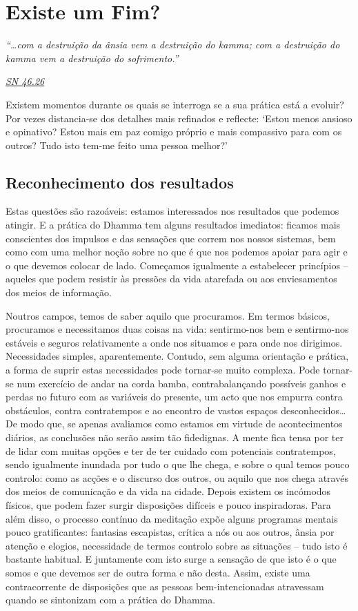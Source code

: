 \chapter{Existe um Fim?}

\emph{``\ldots{}com a destruição da ânsia vem a destruição do kamma; com a destruição do kamma vem a destruição do sofrimento.''}

\href{https://suttacentral.net/sn46.26/en/bodhi}{\emph{SN 46.26}}

Existem momentos durante os quais se interroga se a sua prática está a evoluir? Por vezes distancia-se dos detalhes mais refinados e reflecte: `Estou menos ansioso e opinativo? Estou mais em paz comigo próprio e mais compassivo para com os outros? Tudo isto tem-me feito uma pessoa melhor?'

\section{Reconhecimento dos resultados}

Estas questões são razoáveis: estamos interessados nos resultados que podemos atingir. E a prática do Dhamma tem alguns resultados imediatos: ficamos mais conscientes dos impulsos e das sensações que correm nos nossos sistemas, bem como com uma melhor noção sobre no que é que nos podemos apoiar para agir e o que devemos colocar de lado. Começamos igualmente a estabelecer princípios -- aqueles que podem resistir às pressões da vida atarefada ou aos enviesamentos dos meios de informação.

Noutros campos, temos de saber aquilo que procuramos. Em termos básicos, procuramos e necessitamos duas coisas na vida: sentirmo-nos bem e sentirmo-nos estáveis e seguros relativamente a onde nos situamos e para onde nos dirigimos. Necessidades simples, aparentemente. Contudo, sem alguma orientação e prática, a forma de suprir estas necessidades pode tornar-se muito complexa. Pode tornar-se num exercício de andar na corda bamba, contrabalançando possíveis ganhos e perdas no futuro com as variáveis do presente, um acto que nos empurra contra obstáculos, contra contratempos e ao encontro de vastos espaços desconhecidos\ldots{} De modo que, se apenas avaliamos como estamos em virtude de acontecimentos diários, as conclusões não serão assim tão fidedignas. A mente fica tensa por ter de lidar com muitas opções e ter de ter cuidado com potenciais contratempos, sendo igualmente inundada por tudo o que lhe chega, e sobre o qual temos pouco controlo: como as acções e o discurso dos outros, ou aquilo que nos chega através dos meios de comunicação e da vida na cidade. Depois existem os incómodos físicos, que podem fazer surgir disposições difíceis e pouco inspiradoras. Para além disso, o processo contínuo da meditação expõe alguns programas mentais pouco gratificantes: fantasias escapistas, crítica a nós ou aos outros, ânsia por atenção e elogios, necessidade de termos controlo sobre as situações -- tudo isto é bastante habitual. E juntamente com isto surge a sensação de que isto é o que somos e que devemos ser de outra forma e não desta. Assim, existe uma contracorrente de disposições que as pessoas bem-intencionadas atravessam quando se sintonizam com a prática do Dhamma.

